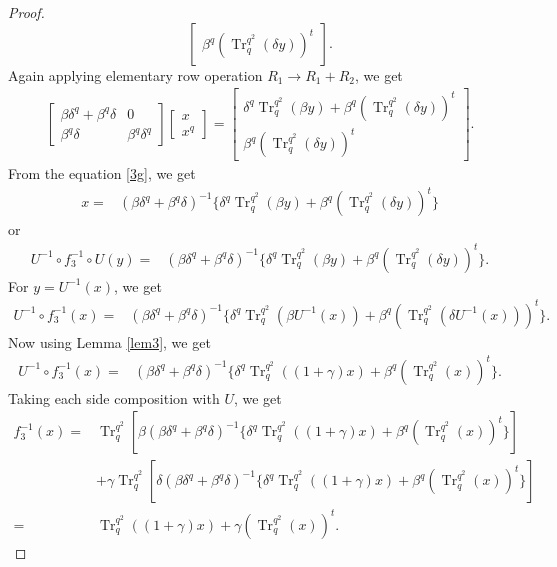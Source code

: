 \documentclass[10pt,a4paper]{amsart}
\begin{document}
\begin{proof}
$$\begin{bmatrix}
		\beta^{q}(\operatorname{Tr}_{q}^{q^2}(\delta y))^t
	\end{bmatrix}.$$
	Again applying elementary row operation $R_1\rightarrow R_1+R_2$, we get
	\begin{align}\begin{bmatrix}
			\beta\delta^{q}+\beta^{q}\delta&0\\
			\beta^{q}\delta&\beta^{q}\delta^{q}
		\end{bmatrix}
		\begin{bmatrix}
			x\\x^{q}
		\end{bmatrix}=
	\begin{bmatrix}
		\delta^{q}\operatorname{Tr}_{q}^{q^2}(\beta y)+	\beta^{q}(\operatorname{Tr}_{q}^{q^2}(\delta y))^t\\
		\beta^{q}(\operatorname{Tr}_{q}^{q^2}(\delta y))^t
	\end{bmatrix}.\label{3g}\end{align}
	From the equation \ref{3g}, we get
	\begin{align*}
		x=&(\beta\delta^{q}+\beta^{q}\delta)^{-1}\{\delta^{q}\operatorname{Tr}_{q}^{q^2}(\beta y)+\beta^{q}(\operatorname{Tr}_{q}^{q^2}(\delta y))^t\}
	\end{align*}
	or\begin{align*}
		U^{-1}\circ f_3^{-1}\circ U(y)=&(\beta\delta^{q}+\beta^{q}\delta)^{-1}\{\delta^{q}\operatorname{Tr}_{q}^{q^2}(\beta y)+\beta^{q}(\operatorname{Tr}_{q}^{q^2}(\delta y))^t\}.
	\end{align*}
	For $y=U^{-1}(x)$, we get
	\begin{align*}
		U^{-1}\circ f_3^{-1}(x)=&(\beta\delta^{q}+\beta^{q}\delta)^{-1}\{\delta^{q}\operatorname{Tr}_{q}^{q^2}(\beta U^{-1}(x))+\beta^{q}(\operatorname{Tr}_{q}^{q^2}(\delta U^{-1}(x)))^t\}.
	\end{align*}
	Now using Lemma \ref{lem3}, we get
	\begin{align*}
		U^{-1}\circ f_3^{-1}(x)=&(\beta\delta^{q}+\beta^{q}\delta)^{-1}\{\delta^{q}\operatorname{Tr}_{q}^{q^2}((1+\gamma)x)+\beta^{q}(\operatorname{Tr}_{q}^{q^2}(x))^t\}.
	\end{align*}
	Taking each side composition with $U$, we get
	\begin{align*}
		f_3^{-1}(x)=&\operatorname{Tr}_{q}^{q^2}[\beta (\beta\delta^{q}+\beta^{q}\delta)^{-1}\{\delta^{q}\operatorname{Tr}_{q}^{q^2}((1+\gamma)x)+\beta^{q}(\operatorname{Tr}_{q}^{q^2}(x))^t\}]\\&+\gamma\operatorname{Tr}_{q}^{q^2}[\delta (\beta\delta^{q}+\beta^{q}\delta)^{-1}\{\delta^{q}\operatorname{Tr}_{q}^{q^2}((1+\gamma)x)+\beta^{q}(\operatorname{Tr}_{q}^{q^2}(x))^t\}]\\
		=&\operatorname{Tr}_{q}^{q^2}((1+\gamma)x)+\gamma(\operatorname{Tr}_{q}^{q^2}(x))^t.
	\end{align*}
\end{proof}
\end{document}
